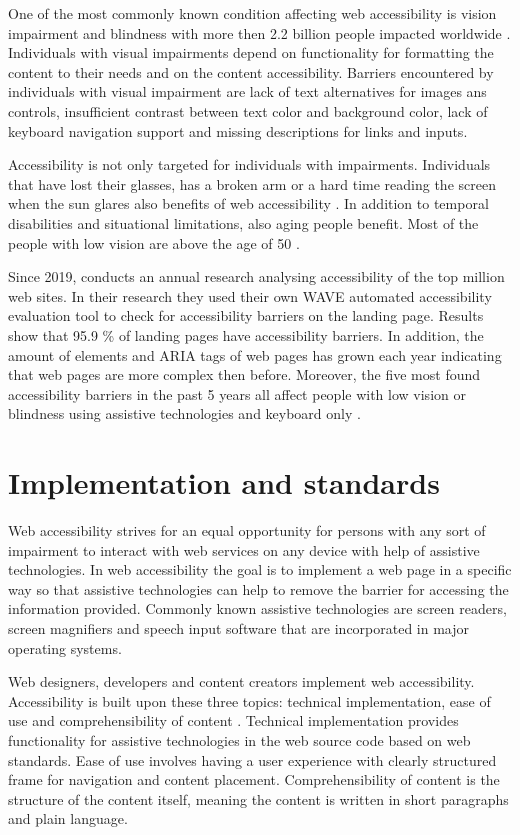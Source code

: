 One of the most commonly known condition affecting web accessibility is vision impairment and blindness with more then 2.2 billion people impacted worldwide \citep[Chapter~1]{whovision, webaccessibility}. Individuals with visual impairments depend on functionality for formatting the content to their needs and on the content accessibility. Barriers encountered by individuals with visual impairment are lack of text alternatives for images ans controls, insufficient contrast between text color and background color, lack of keyboard navigation support and missing descriptions for links and inputs. 

Accessibility is not only targeted for individuals with impairments. Individuals that have lost their glasses, has a broken arm or a hard time reading the screen when the sun glares also benefits of web accessibility \citep{w3cbarriers}. In addition to temporal disabilities and situational limitations, also aging people benefit. Most of the people with low vision are above the age of 50 \citep{whovision}.

Since 2019, \cite{webaimmillions} conducts an annual research analysing accessibility of the top million web sites. In their research they used their own WAVE automated accessibility evaluation tool to check for accessibility barriers on the landing page. Results show that 95.9 \% of landing pages have accessibility barriers. In addition, the amount of elements and ARIA tags of web pages has grown each year indicating that web pages are more complex then before. Moreover, the five most found accessibility barriers in the past 5 years all affect people with low vision or blindness using assistive technologies and keyboard only \cite{webaimmillions}.

\section{Implementation and standards}

Web accessibility strives for an equal opportunity for persons with any sort of impairment to interact with web services on any device with help of assistive technologies. In web accessibility the goal is to implement a web page in a specific way so that assistive technologies can help to remove the barrier for accessing the information provided. Commonly known assistive technologies are screen readers, screen magnifiers and speech input software that are incorporated in major operating systems.

Web designers, developers and content creators implement web accessibility. Accessibility is built upon these three topics: technical implementation, ease of use and comprehensibility of content \citep{webaccessibilitydefinition}. Technical implementation provides functionality for assistive technologies in the web source code based on web standards. Ease of use involves having a user experience with clearly structured frame for navigation and content placement. Comprehensibility of content is the structure of the content itself, meaning the content is written in short paragraphs and plain language. 

